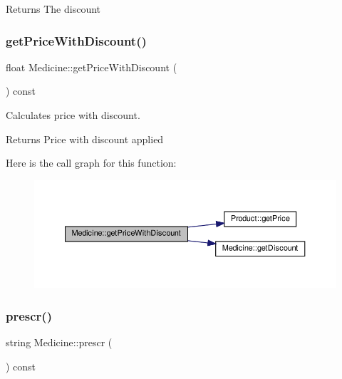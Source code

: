 \begin{DoxyReturn}{Returns}
The discount 
\end{DoxyReturn}
\mbox{\label{classMedicine_a313a6ad362c0746ddb96425b097a8f77}} 
\subsubsection{\texorpdfstring{get\+Price\+With\+Discount()}{getPriceWithDiscount()}}
{\footnotesize\ttfamily float Medicine\+::get\+Price\+With\+Discount (\begin{DoxyParamCaption}{ }\end{DoxyParamCaption}) const}



Calculates price with discount. 

\begin{DoxyReturn}{Returns}
Price with discount applied 
\end{DoxyReturn}
Here is the call graph for this function\+:\nopagebreak
\begin{figure}[H]
\begin{center}
\leavevmode
\includegraphics[width=350pt]{classMedicine_a313a6ad362c0746ddb96425b097a8f77_cgraph}
\end{center}
\end{figure}
\mbox{\label{classMedicine_a502f519c44cfb89071af6a920fb773e3}} 
\subsubsection{\texorpdfstring{prescr()}{prescr()}}
{\footnotesize\ttfamily string Medicine\+::prescr (\begin{DoxyParamCaption}{ }\end{DoxyParamCaption}) const}

